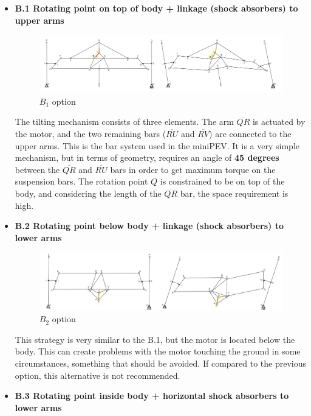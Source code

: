 \begin{itemize}
\begin{itemize}
	\item \textbf{B.1 Rotating point on top of body + linkage (shock absorbers) to upper arms}
	
	\begin{figure}[h!]
		\includegraphics[width=1.1\linewidth]{figs/04/b_1}
		\caption{$B_{1}$ option}
	\end{figure}
	The tilting mechanism consists of three elements. The arm $\overline{QR}$ is actuated by the motor, and the two remaining bars ($\overline{RU}$ and $\overline{RV}$) are connected to the upper arms. This is the bar system used in the miniPEV. It is a very simple mechanism, but in terms of geometry, requires an angle of \textbf{45 degrees} between the $\overline{QR}$ and $\overline{RU}$ bars in order to get maximum torque on the suspension bars. The rotation point $Q$ is constrained to be on top of the body, and considering the length of the $\overline{QR}$ bar, the space requirement is high.
	\newpage
	\item \textbf{B.2 Rotating point below body + linkage (shock absorbers) to lower arms}
	
	\begin{figure}[h!]
		\includegraphics[width=1.1\linewidth]{figs/04/b_2}
		\caption{$B_{2}$ option}
	\end{figure}
	This strategy is very similar to the B.1, but the motor is located below the body. This can create problems with the motor touching the ground in some circumstances, something that should be avoided. If compared to the previous option, this alternative is not recommended. 
		
		\item \textbf{B.3 Rotating point inside body + horizontal shock absorbers to lower arms}
	

\end{itemize}
\end{itemize}
